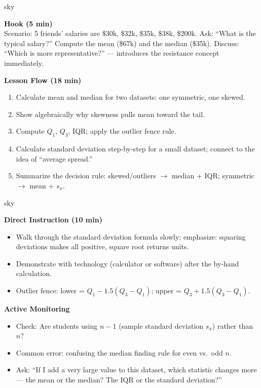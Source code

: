 \documentclass[10pt]{article}
\begin{document}
\begin{skillbox}{sky}
\begin{minipage}[t]{0.48\linewidth}
    \textbf{Hook (5 min)}\\
    Scenario: 5 friends' salaries are \$30k, \$32k, \$35k, \$38k, \$200k. Ask: ``What is the typical salary?'' Compute the mean (\$67k) and the median (\$35k). Discuss: ``Which is more representative?'' --- introduces the resistance concept immediately.
\end{minipage}
\hfill
\begin{minipage}[t]{0.48\linewidth}
    \textbf{Lesson Flow (18 min)}
    \begin{enumerate}
        \item Calculate mean and median for two datasets: one symmetric, one skewed.
        \item Show algebraically why skewness pulls mean toward the tail.
        \item Compute $Q_1$, $Q_3$, IQR; apply the outlier fence rule.
        \item Calculate standard deviation step-by-step for a small dataset; connect to the idea of ``average spread.''
        \item Summarize the decision rule: skewed/outliers $\to$ median + IQR; symmetric $\to$ mean + $s_x$.
    \end{enumerate}
\end{minipage}
\end{skillbox}

\begin{skillbox}{sky}
\begin{minipage}[t]{0.48\linewidth}
    \textbf{Direct Instruction (10 min)}
    \begin{itemize}
        \item Walk through the standard deviation formula slowly; emphasize: squaring deviations makes all positive, square root returns units.
        \item Demonstrate with technology (calculator or software) after the by-hand calculation.
        \item Outlier fence: lower = $Q_1 - 1.5(Q_3-Q_1)$; upper = $Q_3 + 1.5(Q_3-Q_1)$.
    \end{itemize}
\end{minipage}
\hfill
\begin{minipage}[t]{0.48\linewidth}
    \textbf{Active Monitoring}
    \begin{itemize}
        \item Check: Are students using $n-1$ (sample standard deviation $s_x$) rather than $n$?
        \item Common error: confusing the median finding rule for even vs.\ odd $n$.
        \item Ask: ``If I add a very large value to this dataset, which statistic changes more --- the mean or the median? The IQR or the standard deviation?''
    \end{itemize}
\end{minipage}
\end{skillbox}
\end{document}
